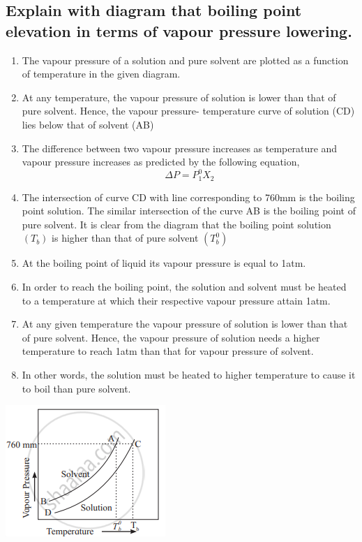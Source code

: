 \documentclass{article}
\begin{document}
   \subsection{Explain with diagram that boiling point elevation 
   in terms of vapour pressure lowering.}
   \begin{enumerate}
	\item The vapour pressure of a solution and pure solvent are
	plotted as a function of temperature in the given diagram.
	\item At any temperature, the vapour pressure of solution is
	lower than that of pure solvent. Hence, the vapour pressure-
	temperature curve of solution (CD) lies below that of solvent
	(AB)
	\item The difference between two vapour pressure increases
	as temperature and vapour pressure increases as predicted by
	the following equation,
	\begin{equation} \Delta P = P_1^0 X_2 \end{equation}
	\item The intersection of curve CD with line corresponding to
	760mm is the boiling point solution. The similar intersection
	of the curve AB is the boiling point of pure solvent. It is
	clear from the diagram that the boiling point solution $(T_b)$
	is higher than that of pure solvent $(T_b^0)$
	\item At the boiling point of liquid its vapour pressure is
	equal to 1atm.
	\item In order to reach the boiling point, the solution and 
	solvent must be heated to a temperature at which their
	respective vapour pressure attain 1atm.
	\item At any given temperature the vapour pressure of solution
	is lower than that of pure solvent. Hence, the vapour pressure
	of solution needs a higher temperature to reach 1atm than that
	for vapour pressure of solvent.
	\item In other words, the solution must be heated to higher
	temperature to cause it to boil than pure solvent.
   \end{enumerate}
   \begin{center}
	   \includegraphics[scale=0.7]{prestemp}
   \end{center}
   	
\end{document}

